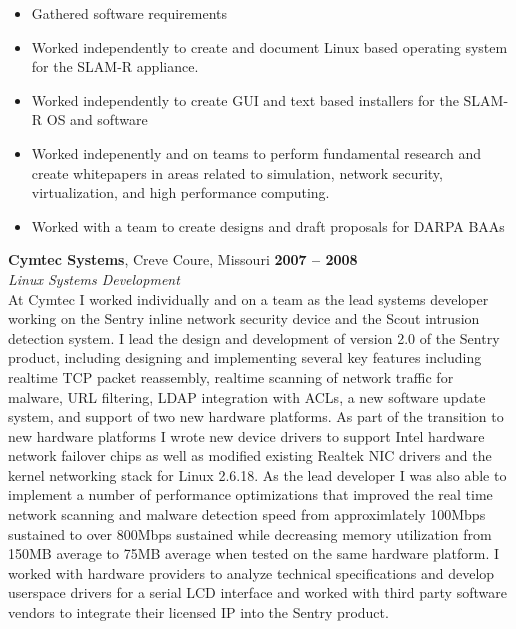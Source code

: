 \documentclass[margin,line]{resume}
\begin{document}
\begin{resume}
\begin{itemize}
\item Gathered software requirements
\item Worked independently to create and document Linux based operating system for the SLAM-R appliance.
\item Worked independently to create GUI and text based installers for the
      SLAM-R OS and software
\item Worked indepenently and on teams to perform fundamental research and
      create whitepapers in areas related to simulation, network security,
      virtualization, and high performance computing.
\item Worked with a team to create designs and draft proposals for DARPA BAAs
\end{itemize}

\textbf{Cymtec Systems}, Creve Coure, Missouri \hfill \textbf{2007 -- 2008}\vspace{1mm}\\\vspace{1mm}%
\textit{\small{Linux Systems Development}}\vspace{1mm}\\\vspace{0mm}%
At Cymtec I worked individually and on a team as the lead systems developer
working on the Sentry inline network security device and the Scout intrusion
detection system. I lead the design and development of version 2.0 of the
Sentry product, including designing and implementing several key features
including realtime TCP packet reassembly, realtime scanning of network traffic
for malware, URL filtering, LDAP integration with ACLs, a new software update
system, and support of two new hardware platforms. As part of the transition to
new hardware platforms I wrote new device drivers to support Intel hardware
network failover chips as well as modified existing Realtek NIC drivers and the
kernel networking stack for Linux 2.6.18. As the lead developer I was also able
to implement a number of performance optimizations that improved the real time
network scanning and malware detection speed from approximlately 100Mbps
sustained to over 800Mbps sustained while decreasing memory utilization from
150MB average to 75MB average when tested on the same hardware platform. I
worked with hardware providers to analyze technical specifications and develop
userspace drivers for a serial LCD interface and worked with third party
software vendors to integrate their licensed IP into the Sentry product.
\vspace{1mm}\\\vspace{0mm}

\end{resume}
\end{document}
